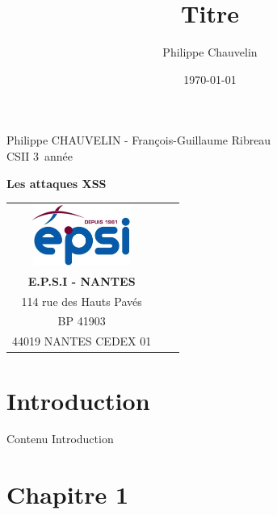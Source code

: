\documentclass[a4paper,12pt]{report}
\title{Titre}
\author{Philippe Chauvelin}
\date{\today}
\begin{document}
	\begin{titlepage}
		\begin{center}
			Philippe CHAUVELIN - François-Guillaume Ribreau\\
			CSII 3\ieme~année\\
		\end{center}
		\hrulefill
		\vspace{7cm}
		\begin{center} 
			\LARGE \textbf{Les attaques XSS}\\
			\vspace{6cm}
		
			\begin{tabular}{cp{4cm}c}
				\includegraphics[height=75px]{images/logo_epsi.jpg}\\
				\textbf{E.P.S.I - NANTES}\\
				114 rue des Hauts Pavés\\
				BP 41903\\
				44019 NANTES CEDEX 01\\
			\end{tabular}
		\end{center}
	\end{titlepage}
	\newpage
	
	\newpage
	\null
	\thispagestyle{empty}
	\setcounter{page}{0}
	\newpage
	
	
	\setcounter{page}{1}
	\thispagestyle{empty}
	\newpage
	
	\chapter*{Introduction} %
		\setcounter{section}{1}
		
		
		Contenu Introduction
		
			
		\newpage
	
	\chapter{Chapitre 1} %
\end{document}
